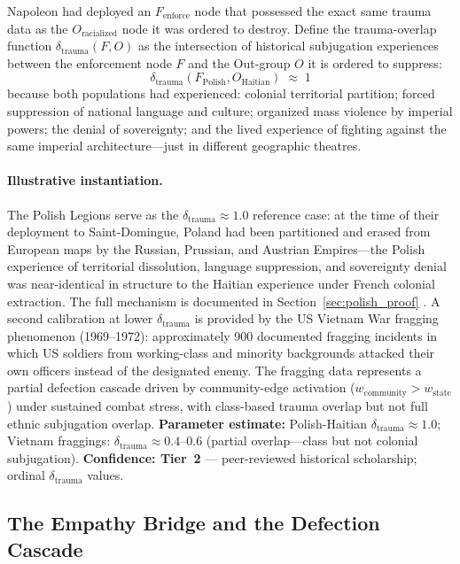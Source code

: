 Napoleon had deployed an $F_{\text{enforce}}$ node that possessed the exact same trauma data as the $O_{\text{racialized}}$ node it was ordered to destroy. Define the trauma-overlap function $\delta_{\text{trauma}}(F, O)$ as the intersection of historical subjugation experiences between the enforcement node $F$ and the Out-group $O$ it is ordered to suppress:
\begin{equation}\label{eq:14.21-empathy-permeability}
\delta_{\text{trauma}}(F_{\text{Polish}}, O_{\text{Haitian}}) \;\approx\; 1
\end{equation}
because both populations had experienced: colonial territorial partition; forced suppression of national language and culture; organized mass violence by imperial powers; the denial of sovereignty; and the lived experience of fighting against the same imperial architecture---just in different geographic theatres.

\paragraph{Illustrative instantiation.}
The Polish Legions serve as the $\delta_{\text{trauma}} \approx 1.0$ reference case: at the time of their deployment to Saint-Domingue, Poland had been partitioned and erased from European maps by the Russian, Prussian, and Austrian Empires---the Polish experience of territorial dissolution, language suppression, and sovereignty denial was near-identical in structure to the Haitian experience under French colonial extraction. The full mechanism is documented in Section~\ref{sec:polish_proof} \cite{pachonski_polish_haiti}. A second calibration at lower $\delta_{\text{trauma}}$ is provided by the US Vietnam War fragging phenomenon (1969--1972): approximately 900 documented fragging incidents in which US soldiers from working-class and minority backgrounds attacked their own officers instead of the designated enemy. The fragging data represents a partial defection cascade driven by community-edge activation ($w_{\text{community}} > w_{\text{state}}$) under sustained combat stress, with class-based trauma overlap but not full ethnic subjugation overlap. \textbf{Parameter estimate:} Polish-Haitian $\delta_{\text{trauma}} \approx 1.0$; Vietnam fraggings: $\delta_{\text{trauma}} \approx 0.4$--0.6 (partial overlap---class but not colonial subjugation). \textbf{Confidence: Tier~2} --- peer-reviewed historical scholarship; ordinal $\delta_{\text{trauma}}$ values.

\subsection{The Empathy Bridge and the Defection Cascade}


